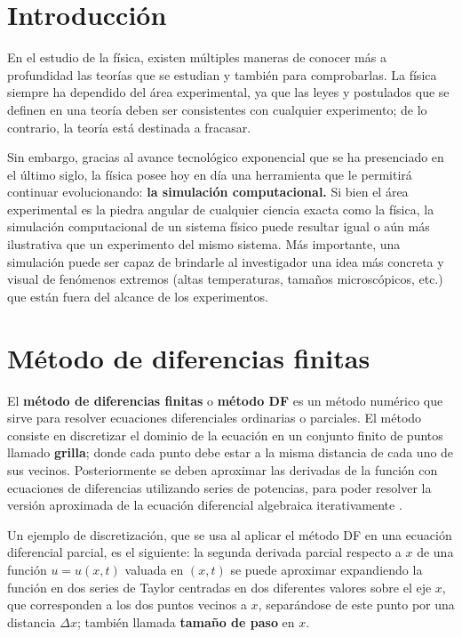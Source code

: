 \documentclass[12pt]{article}
\begin{document}
	\newpage
	\tableofcontents
	\clearpage
	
	\section{Introducción}
	En el estudio de la física, existen múltiples maneras de conocer más a profundidad las teorías que se estudian y también para comprobarlas. La física siempre ha dependido del área experimental, ya que las leyes y postulados que se definen en una teoría deben ser consistentes con cualquier experimento; de lo contrario, la teoría está destinada a fracasar. 
	
	Sin embargo, gracias al avance tecnológico exponencial que se ha presenciado en el último siglo, la física posee hoy en día una herramienta que le permitirá continuar evolucionando: \textbf{la simulación computacional.} Si bien el área experimental es la piedra angular de cualquier ciencia exacta como la física, la simulación computacional de un sistema físico puede resultar igual o aún más ilustrativa que un experimento del mismo sistema. Más importante, una simulación puede ser capaz de brindarle al investigador una idea más concreta y visual de fenómenos extremos (altas temperaturas, tamaños microscópicos, etc.) que están fuera del alcance de los experimentos.
	\clearpage
	
	\section{Método de diferencias finitas}
	El \textbf{método de diferencias finitas} o \textbf{método DF} es un método numérico que sirve para resolver ecuaciones diferenciales ordinarias o parciales. El método consiste en discretizar el dominio de la ecuación en un conjunto finito de puntos llamado \textbf{grilla}; donde cada punto debe estar a la misma distancia de cada uno de sus vecinos. Posteriormente se deben aproximar las derivadas de la función con ecuaciones de diferencias utilizando series de potencias, para poder resolver la versión aproximada de la ecuación diferencial algebraica iterativamente \cite{devries2011first}.
	
	Un ejemplo de discretización, que se usa al aplicar el método DF en una ecuación diferencial parcial, es el siguiente: la segunda derivada parcial respecto a $x$ de una función $u = u(x,t)$ valuada en $(x,t)$ se puede aproximar expandiendo la función en dos series de Taylor centradas en dos diferentes valores sobre el eje $x$, que corresponden a los dos puntos vecinos a $x$, separándose de este punto por una distancia $\Delta x$; también llamada \textbf{tamaño de paso} en $x$. 
	
\end{document}
